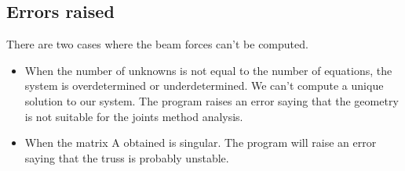 \documentclass{article}
\begin{document}
\subsection{Errors raised}

There are two cases where the beam forces can't be computed.
\begin{itemize}
\item When the number of unknowns is not equal to the number of equations, the system is overdetermined or underdetermined. We can't compute a unique solution to our system. The program raises an error saying that the geometry is not suitable for the joints method analysis.
\item When the matrix A obtained is singular. The program will raise an error saying that the truss is probably unstable.
\end{itemize}
\end{document}
